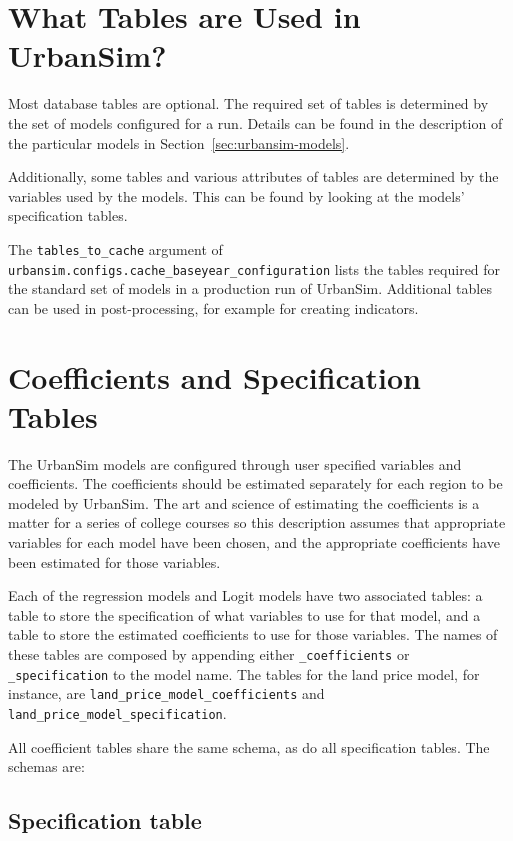 \section{What Tables are Used in UrbanSim?}
%
Most database tables are optional. The required set of tables is determined by the set of models configured for
a run. Details can be found in the description of the particular models in Section~\ref{sec:urbansim-models}. 

Additionally, some tables and various attributes of tables are determined by 
the variables \variablesindex used by the models.  This can be found by looking at the models'
specification tables.

The \verb|tables_to_cache| argument of
\verb|urbansim.configs.cache_baseyear_configuration| lists the tables required for the standard set of models \modelsindex 
in a production run of UrbanSim. Additional tables can be used in post-processing, for example for creating
indicators.


\section{Coefficients and Specification Tables}

The UrbanSim models \modelsindex are configured through user specified
variables and coefficients. \coefficientsindex The coefficients should be
estimated separately for each region to be modeled by UrbanSim. The art and
science of estimating the coefficients is a matter for a series of college
courses so this description assumes that appropriate variables for each model
have been chosen, and the appropriate coefficients have been estimated for
those variables.

Each of the regression models and Logit models have two associated
tables: a table to store the specification of what variables to use
for that model, and a table to store the estimated coefficients to
use for those variables.  The names of these tables are composed by
appending either \verb|_coefficients| or \verb|_specification| to
the model name.  The tables for the land price model, for instance,
are \verb|land_price_model_coefficients| and
\verb|land_price_model_specification|.

All coefficient tables share the same schema, as do all
specification tables. The schemas are:


\subsection{Specification table}

